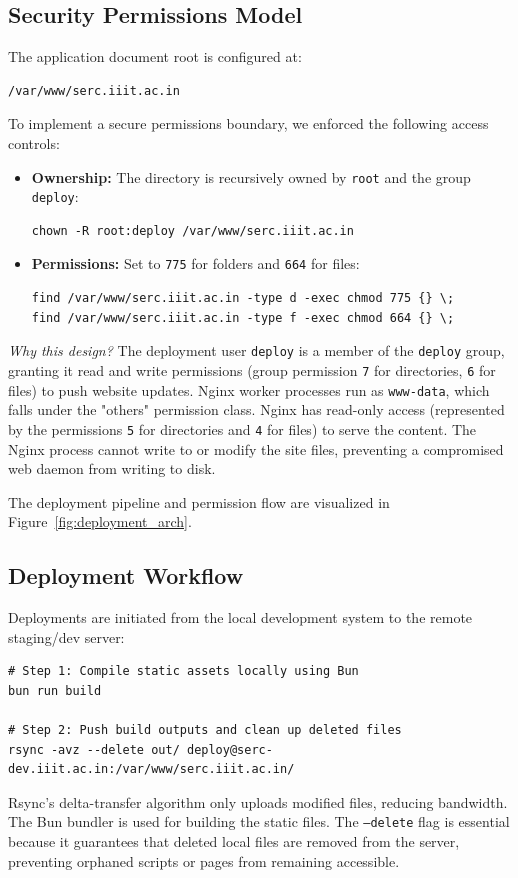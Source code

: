 \documentclass[11pt,a4paper,DIV=16,headings=normal,parskip=half]{scrartcl}
\begin{document}
\subsection{Security Permissions Model}
The application document root is configured at:
\begin{lstlisting}
/var/www/serc.iiit.ac.in
\end{lstlisting}
To implement a secure permissions boundary, we enforced the following access controls:
\begin{itemize}
\item \textbf{Ownership:} The directory is recursively owned by \texttt{root} and the group \texttt{deploy}:
\begin{lstlisting}
chown -R root:deploy /var/www/serc.iiit.ac.in
\end{lstlisting}
\item \textbf{Permissions:} Set to \texttt{775} for folders and \texttt{664} for files:
\begin{lstlisting}
find /var/www/serc.iiit.ac.in -type d -exec chmod 775 {} \;
find /var/www/serc.iiit.ac.in -type f -exec chmod 664 {} \;
\end{lstlisting}
\end{itemize}
\textit{Why this design?} The deployment user \texttt{deploy} is a member of the \texttt{deploy} group, granting it read and write permissions (group permission \texttt{7} for directories, \texttt{6} for files) to push website updates. Nginx worker processes run as \texttt{www-data}, which falls under the "others" permission class. Nginx has read-only access (represented by the permissions \texttt{5} for directories and \texttt{4} for files) to serve the content. The Nginx process cannot write to or modify the site files, preventing a compromised web daemon from writing to disk.

The deployment pipeline and permission flow are visualized in Figure~\ref{fig:deployment_arch}.

\subsection{Deployment Workflow}
Deployments are initiated from the local development system to the remote staging/dev server:
\begin{lstlisting}
# Step 1: Compile static assets locally using Bun
bun run build

# Step 2: Push build outputs and clean up deleted files
rsync -avz --delete out/ deploy@serc-dev.iiit.ac.in:/var/www/serc.iiit.ac.in/
\end{lstlisting}
Rsync's delta-transfer algorithm \cite{rsync-tool} only uploads modified files, reducing bandwidth. The Bun bundler \cite{bun-sh} is used for building the static files. The \texttt{--delete} flag is essential because it guarantees that deleted local files are removed from the server, preventing orphaned scripts or pages from remaining accessible.
\end{document}
